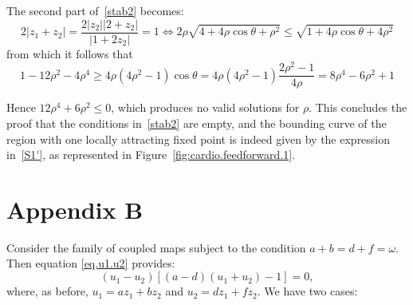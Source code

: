 \documentclass[10pt]{article}
\begin{document}
The second part of~\eqref{stab2} becomes:
\begin{equation*}
2|z_1+z_2 | = \frac{2|z_2 | |2+z_2 |}{\vert 1+2z_2 |} =1 \iff 2\rho \sqrt{4+4 \rho \cos\theta+\rho^2} \leq \sqrt{1+4\rho \cos\theta+4\rho^2}
\end{equation*}
from which it follows that
\begin{equation*}
1-12\rho^2-4\rho^4 \geq 4\rho (4\rho^2-1) \cos \theta = 4\rho (4\rho^2-1) \frac{2\rho^2-1}{4\rho} = 8\rho^4-6\rho^2+1
\end{equation*}

Hence $12\rho^4+6\rho^2 \leq 0$, which produces no valid solutions for $\rho$. This concludes the proof that the conditions in~\eqref{stab2} are empty, and the bounding curve of the region with one locally attracting fixed point is indeed given by the expression in~\eqref{S1'}, as represented in Figure~\ref{fig:cardio.feedforward.1}.

\section*{Appendix B}

Consider the family of coupled maps subject to the condition $a + b = d + f = \omega$. Then equation \eqref{eq.u1.u2} provides:
\[
(u_1-u_2)\left[(a-d)(u_1+u_2)-1\right]=0,
\]
where, as before, $u_1=az_1+bz_2$ and $u_2=dz_1+fz_2$. We have two cases:\\
\end{document}

